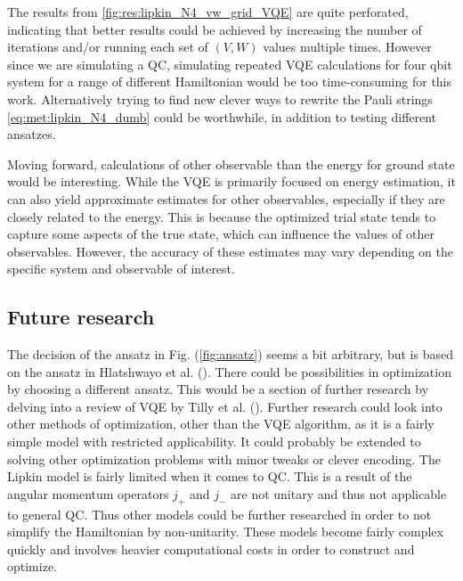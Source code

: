The results from \cref{fig:res:lipkin_N4_vw_grid_VQE} are quite perforated, indicating that better results could be achieved by increasing the number of iterations and/or running each set of $(V,W)$ values multiple times. However since we are simulating a QC, simulating repeated VQE calculations for four qbit system for a range of different Hamiltonian would be too time-consuming for this work. Alternatively trying to find new clever ways to rewrite the Pauli strings \cref{eq:met:lipkin_N4_dumb} could be worthwhile, in addition to testing different ansatzes.      

Moving forward, calculations of other observable than the energy for ground state would be interesting. While the VQE is primarily focused on energy estimation, it can also yield approximate estimates for other observables, especially if they are closely related to the energy. This is because the optimized trial state tends to capture some aspects of the true state, which can influence the values of other observables. However, the accuracy of these estimates may vary depending on the specific system and observable of interest.

\subsection{Future research}
The decision of the ansatz in Fig. (\ref{fig:ansatz}) seems a bit arbitrary, but is based on the ansatz in Hlatshwayo et al. (\cite{hlatshwayoSimulatingExcitedStates2022}). There could be possibilities in optimization by choosing a different ansatz. This would be a section of further research by delving into a review of VQE by Tilly et al. (\cite{VQE_review}).\newline 
Further research could look into other methods of optimization, other than the VQE algorithm, as it is a fairly simple model with restricted applicability. It could probably be extended to solving other optimization problems with minor tweaks or clever encoding. The Lipkin model is fairly limited when it comes to QC. This is a result of the angular momentum operators $j_+$ and $j_-$ are not unitary and thus not applicable to general QC. Thus other models could be further researched in order to not simplify the Hamiltonian by non-unitarity. These models become fairly complex quickly and involves heavier computational costs in order to construct and optimize. 
